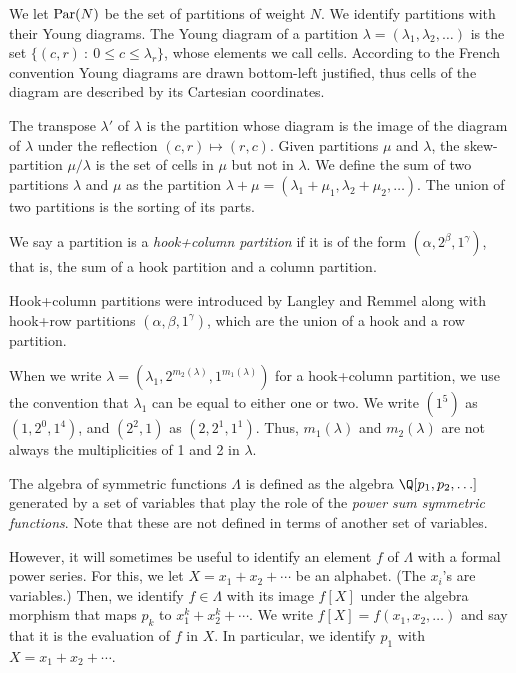 \documentclass[twoside]{article}
\begin{document}
\newcommand{\Par}{\textnormal{Par}}
We let $\Par(N)$ be the set of partitions of weight $N$. We identify partitions with their Young diagrams.  The Young diagram of a partition $\lambda = (\lambda_1, \lambda_2, \ldots)$ is the set $\{(c,r)\ :\ 0\le c\le \lambda_r\}$, whose elements we call cells. According to the
French convention Young diagrams are drawn bottom-left justified, thus cells of the diagram are described by its Cartesian coordinates.

The transpose $\lambda'$ of $\lambda$ is the partition whose diagram is the image of the diagram of $\lambda$ under the reflection $(c,r)\mapsto(r,c)$. Given partitions $\mu$ and $\lambda$, the skew-partition $\mu/\lambda$ is the set of cells in $\mu$ but not in $\lambda$. We define the sum of two partitions $\lambda$ and  $\mu$ as the partition $\lambda+\mu = (\lambda_1+\mu_1, \lambda_2+\mu_2,\ldots)$. The union of two partitions is the sorting of its parts.

\begin{de}
    We say a partition is a \emph{hook+column partition} if it is of the form $(\alpha, 2^\beta, 1^\gamma)$, that is, the sum of a hook partition and a column partition.
\end{de}
Hook+column partitions were introduced by Langley and Remmel \cite{langley} along with hook+row partitions $(\alpha,\beta,1^\gamma)$, which are the union of a hook and a row partition.

\begin{warning}
When we write $\lambda = (\lambda_1, 2^{m_2(\lambda)}, 1^{m_1(\lambda)})$ for a hook+column partition, we   use the  convention that $\lambda_1$ can be equal to either one or two.
We write $(1^5)$ as $(1, 2^0, 1^4)$, and  $(2^2,1)$ as $(2,2^1,1^1).$
Thus, $m_1(\lambda)$ and $m_2(\lambda)$ are not always the multiplicities of 1 and 2 in $\lambda$.
\end{warning}


The algebra of symmetric functions $\Lambda$ is defined as the algebra $\Q[p_1, p_2, \ldots]$ generated by  a set of variables that play the role of  the \emph{power sum symmetric functions}. Note that these are not defined in terms of another set of variables.  

However, it will sometimes be useful to identify an element $f$ of $\Lambda$ with a  formal power series.  For this, we let $X=x_1+x_2+\cdots$ be an alphabet. (The $x_i$'s are variables.)  Then, we identify  $f\in\Lambda$ with its image $f[X]$ under the algebra morphism that maps $p_k$ to $x_1^k + x_2^k +\cdots$.  We write $f[X] = f(x_1, x_2, \ldots)$ and say that it is the evaluation of $f$ in $X$. In particular, we identify $p_1$ with $X=x_1+x_2+\cdots$.
 
\end{document}
